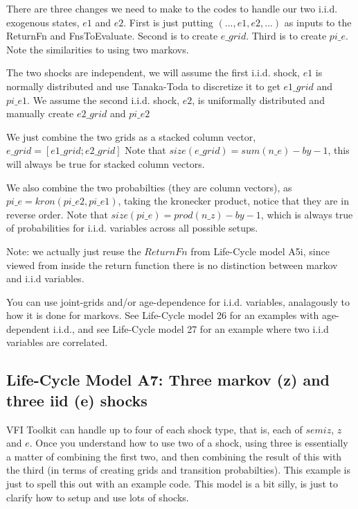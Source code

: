 There are three changes we need to make to the codes to handle our two i.i.d. exogenous states, $e1$ and $e2$. First is just putting $(...,e1,e2,...)$ as inputs to the ReturnFn and FnsToEvaluate. Second is to create $e\_{}grid$. Third is to create $pi\_{}e$. Note the similarities to using two markovs.

The two shocks are independent, we will assume the first i.i.d. shock, $e1$ is normally distributed and use Tanaka-Toda to discretize it to get $e1\_{}grid$ and $pi\_{}e1$. We assume the second i.i.d. shock, $e2$, is uniformally distributed and manually create $e2\_{}grid$ and $pi\_{}e2$

We just combine the two grids as a stacked column vector, $e\_{}grid=[e1\_{}grid; e2\_{}grid]$ Note that $size(e\_{}grid)=sum(n\_{}e)-by-1$, this will always be true for stacked column vectors.

We also combine the two probabilties (they are column vectors), as $pi\_{}e=kron(pi\_{}e2,pi\_{}e1)$, taking the kronecker product, notice that they are in reverse order. Note that $size(pi\_{}e)=prod(n\_{}z)-by-1$, which is always true of probabilities for i.i.d. variables across all possible setups.

Note: we actually just reuse the $ReturnFn$ from Life-Cycle model A5i, since viewed from inside the return function there is no distinction between markov and i.i.d variables.

You can use joint-grids and/or age-dependence for i.i.d. variables, analagously to how it is done for markovs. See Life-Cycle model 26 for an examples with age-dependent i.i.d., and see Life-Cycle model 27 for an example where two i.i.d variables are correlated.

\subsection{Life-Cycle Model A7: Three markov (z) and three iid (e) shocks}
VFI Toolkit can handle up to four of each shock type, that is, each of $semiz$, $z$ and $e$. Once you understand how to use two of a shock, using three is essentially a matter of combining the first two, and then combining the result of this with the third (in terms of creating grids and transition probabilties). This example is just to spell this out with an example code. This model is a bit silly, is just to clarify how to setup and use lots of shocks.

